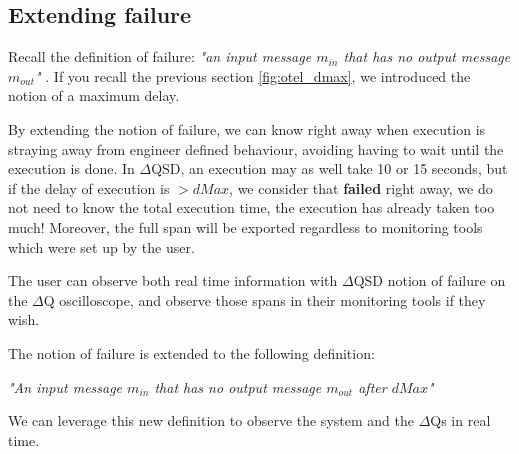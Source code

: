 \subsection{Extending failure}
   Recall the definition of failure: \textit{"an input message $m_{in}$ that has no output message $m_{out}$"} \cite{art}. If you recall the previous section \ref{fig:otel_dmax}, we introduced the notion of a maximum delay. 

   By extending the notion of failure, we can know right away when execution is straying away from engineer defined behaviour, avoiding having to wait until the execution is done. In $\Delta$QSD, an execution may as well take 10 or 15 seconds, but if the delay of execution is $> dMax$, we consider that \textbf{failed} right away, we do not need to know the total execution time, the execution has already taken too much! Moreover, the full span will be exported regardless to monitoring tools which were set up by the user. 

   The user can observe both real time information with $\Delta$QSD notion of failure on the $\Delta$Q oscilloscope, and observe those spans in their monitoring tools if they wish.

The notion of failure is extended to the following definition:
        \begin{center}
            \textit{"An input message $m_{in}$ that has no output message $m_{out}$ after $dMax$"} 
        \end{center}
    We can leverage this new definition to observe the system and the $\Delta$Qs in real time.

